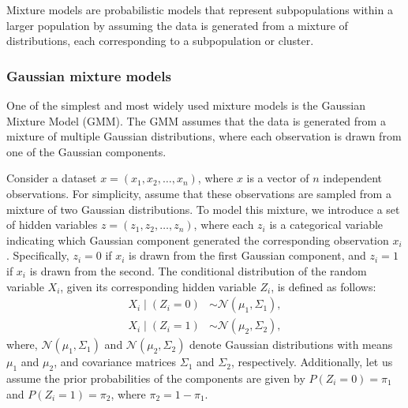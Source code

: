 Mixture models are probabilistic models that represent subpopulations within a larger population by assuming the data is generated from a mixture of distributions, each corresponding to a subpopulation or cluster.

\subsubsection{Gaussian mixture models}

One of the simplest and most widely used mixture models is the Gaussian Mixture Model (GMM). The GMM assumes that the data is generated from a mixture of multiple Gaussian distributions, where each observation is drawn from one of the Gaussian components. 

Consider a dataset $x = (x_1, x_2, \ldots, x_n)$, where $x$ is a vector of $n$ independent observations. For simplicity, assume that these observations are sampled from a mixture of two Gaussian distributions. To model this mixture, we introduce a set of hidden variables $z = (z_1, z_2, \ldots, z_n)$, where each $z_i$ is a categorical variable indicating which Gaussian component generated the corresponding observation $x_i$. Specifically, $z_i = 0$ if $x_i$ is drawn from the first Gaussian component, and $z_i = 1$ if $x_i$ is drawn from the second. The conditional distribution of the random variable $X_i$, given its corresponding hidden variable $Z_i$, is defined as follows:
\begin{align}
    X_i \mid (Z_i = 0) &\sim \mathcal{N}(\mu_1, \Sigma_1), \nonumber \\
    X_i \mid (Z_i = 1) &\sim \mathcal{N}(\mu_2, \Sigma_2), \nonumber
\end{align}
where, $\mathcal{N}(\mu_1, \Sigma_1)$ and $\mathcal{N}(\mu_2, \Sigma_2)$ denote Gaussian distributions with means $\mu_1$ and $\mu_2$, and covariance matrices $\Sigma_1$ and $\Sigma_2$, respectively. Additionally, let us assume the prior probabilities of the components are given by $P(Z_i = 0) = \pi_1$ and $P(Z_i = 1) = \pi_2$, where $\pi_2 = 1 - \pi_1$.


